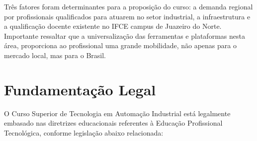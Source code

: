 Três fatores foram determinantes para a proposição do curso: a demanda regional por profissionais qualificados para atuarem no setor industrial, a infraestrutura e a qualificação docente existente no IFCE campus de Juazeiro do Norte. Importante ressaltar que a universalização das ferramentas e plataformas nesta área, proporciona ao profissional uma grande mobilidade, não apenas para o mercado local, mas para o Brasil.

\chapter{Fundamentação Legal}

O Curso Superior de Tecnologia em Automação Industrial está legalmente embasado nas diretrizes educacionais referentes à Educação Profissional Tecnológica, conforme legislação abaixo relacionada:
